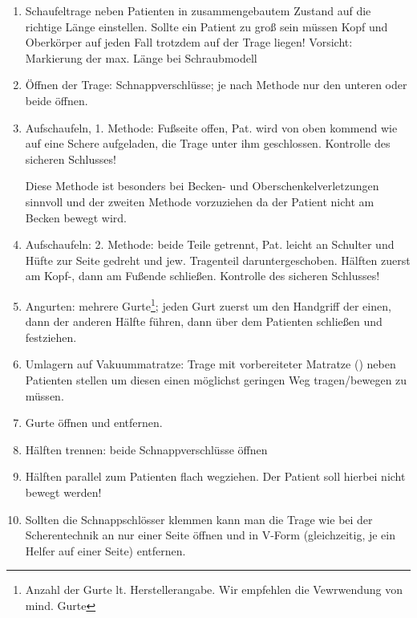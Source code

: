 \begin{enumerate}
    \item Schaufeltrage neben Patienten in zusammengebautem Zustand auf die
    richtige Länge einstellen. Sollte ein Patient zu groß sein
    müssen Kopf und Oberkörper auf jeden Fall trotzdem auf der Trage
    liegen! Vorsicht: Markierung der max. Länge bei Schraubmodell
    \item Öffnen der Trage: Schnappverschlüsse; je nach Methode nur den
    unteren oder beide öffnen.
    \item Aufschaufeln, 1. Methode: Fußseite offen, Pat. wird von oben
    kommend wie auf eine Schere aufgeladen, die Trage unter ihm
    geschlossen. Kontrolle des sicheren Schlusses!
    
    Diese Methode ist besonders bei Becken- und Oberschenkelverletzungen
    sinnvoll und der zweiten Methode vorzuziehen da der Patient nicht am Becken
    bewegt wird.
    \item Aufschaufeln: 2. Methode: beide Teile getrennt, Pat. leicht an
    Schulter und Hüfte zur Seite gedreht und jew. Tragenteil
    daruntergeschoben. Hälften zuerst am Kopf-, dann am Fußende
    schließen. Kontrolle des sicheren Schlusses!
    \item Angurten: mehrere Gurte\footnote{Anzahl der Gurte lt.
    Herstellerangabe. Wir empfehlen die Vewrwendung von mind.  Gurte};
    jeden Gurt zuerst um den Handgriff der einen, dann der anderen Hälfte führen, dann über dem Patienten schließen und festziehen.
    \item Umlagern auf Vakuummatratze: Trage mit vorbereiteter Matratze
    () neben Patienten stellen um diesen
    einen möglichst geringen Weg tragen/bewegen zu müssen.
    \item Gurte öffnen und entfernen.
    \item Hälften trennen: beide Schnappverschlüsse öffnen
    \item Hälften parallel zum Patienten flach wegziehen. Der Patient soll
    hierbei nicht bewegt werden!
    \item Sollten die Schnappschlösser klemmen kann man die Trage wie bei
    der Scherentechnik an nur einer Seite öffnen und in V-Form (gleichzeitig, je
    ein Helfer auf einer Seite) entfernen.
\end{enumerate}


